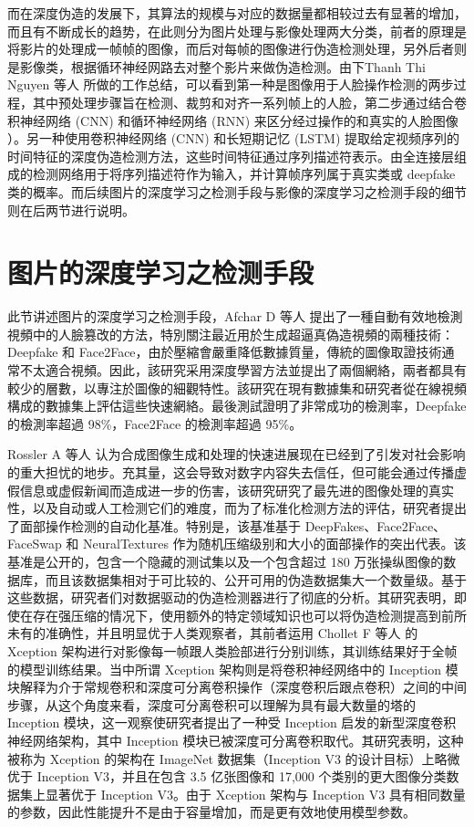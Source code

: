 而在深度伪造的发展下，其算法的规模与对应的数据量都相较过去有显著的增加，而且有不断成长的趋势，在此则分为图片处理与影像处理两大分类，前者的原理是将影片的处理成一帧帧的图像，而后对每帧的图像进行伪造检测处理，另外后者则是影像类，根据循环神经网路去对整个影片来做伪造检测。由下Thanh Thi Nguyen 等人 \cite{https://doi.org/10.48550/arxiv.1909.11573} 所做的工作总结，可以看到第一种是图像用于人脸操作检测的两步过程，其中预处理步骤旨在检测、裁剪和对齐一系列帧上的人脸，第二步通过结合卷积神经网络 (CNN) 和循环神经网络 (RNN) 来区分经过操作的和真实的人脸图像 ）。另一种使用卷积神经网络 (CNN) 和长短期记忆 (LSTM) 提取给定视频序列的时间特征的深度伪造检测方法，这些时间特征通过序列描述符表示。由全连接层组成的检测网络用于将序列描述符作为输入，并计算帧序列属于真实类或 deepfake 类的概率。而后续图片的深度学习之检测手段与影像的深度学习之检测手段的细节则在后两节进行说明。


\section{图片的深度学习之检测手段}

此节讲述图片的深度学习之检测手段，Afchar D 等人 \cite{afchar2018mesonet} 提出了一種自動有效地檢測視頻中的人臉篡改的方法，特別關注最近用於生成超逼真偽造視頻的兩種技術：Deepfake 和 Face2Face，由於壓縮會嚴重降低數據質量，傳統的圖像取證技術通常不太適合視頻。因此，該研究采用深度學習方法並提出了兩個網絡，兩者都具有較少的層數，以專注於圖像的細觀特性。該研究在現有數據集和研究者從在線視頻構成的數據集上評估這些快速網絡。最後測試證明了非常成功的檢測率，Deepfake 的檢測率超過 98\%，Face2Face 的檢測率超過 95\%。

Rossler A 等人 \cite{rossler2019faceforensics++} 认为合成图像生成和处理的快速进展现在已经到了引发对社会影响的重大担忧的地步。充其量，这会导致对数字内容失去信任，但可能会通过传播虚假信息或虚假新闻而造成进一步的伤害，该研究研究了最先进的图像处理的真实性，以及自动或人工检测它们的难度，而为了标准化检测方法的评估，研究者提出了面部操作检测的自动化基准。特别是，该基准基于 DeepFakes、Face2Face、FaceSwap 和 NeuralTextures 作为随机压缩级别和大小的面部操作的突出代表。该基准是公开的，包含一个隐藏的测试集以及一个包含超过 180 万张操纵图像的数据库，而且该数据集相对于可比较的、公开可用的伪造数据集大一个数量级。基于这些数据，研究者们对数据驱动的伪造检测器进行了彻底的分析。其研究表明，即使在存在强压缩的情况下，使用额外的特定领域知识也可以将伪造检测提高到前所未有的准确性，并且明显优于人类观察者，其前者运用 Chollet F 等人 \cite{chollet2017xception} 的 Xception 架构进行对影像每一帧跟人类脸部进行分别训练，其训练结果好于全帧的模型训练结果。当中所谓 Xception 架构则是将卷积神经网络中的 Inception 模块解释为介于常规卷积和深度可分离卷积操作（深度卷积后跟点卷积）之间的中间步骤，从这个角度来看，深度可分离卷积可以理解为具有最大数量的塔的 Inception 模块，这一观察使研究者提出了一种受 Inception 启发的新型深度卷积神经网络架构，其中 Inception 模块已被深度可分离卷积取代。其研究表明，这种被称为 Xception 的架构在 ImageNet 数据集（Inception V3 的设计目标）上略微优于 Inception V3，并且在包含 3.5 亿张图像和 17,000 个类别的更大图像分类数据集上显著优于 Inception V3。由于 Xception 架构与 Inception V3 具有相同数量的参数，因此性能提升不是由于容量增加，而是更有效地使用模型参数。

